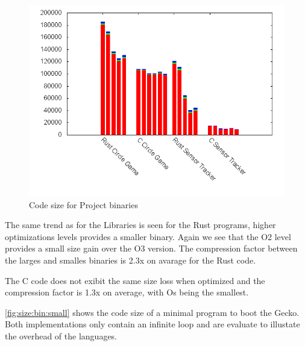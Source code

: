 \begin{figure}[H]
  \begin{center}
    \includegraphics[scale=0.5]{results/plots/size/bin/large/size.png}
  \end{center}
  \caption{Code size for Project binaries}
  \label{fig:size:bin:large}
\end{figure}

The same trend as for the Libraries is seen for the Rust programs, higher optimizations levels provides a smaller binary.
Again we see that the O2 level provides a small size gain over the O3 version.
The compression factor between the larges and smalles binaries is 2.3x on avarage for the Rust code.

The C code does not exibit the same size loss when optimized and the compression factor is 1.3x on average, with Os being the smallest.

\autoref{fig:size:bin:small} shows the code size of a minimal program to boot the Gecko.
Both implementations only contain an infinite loop and are evaluate to illustate the overhead of the languages.

